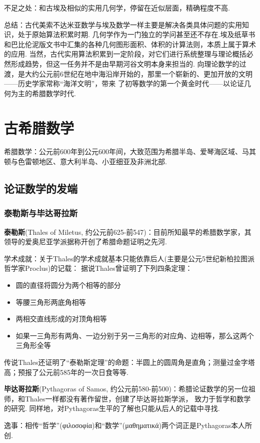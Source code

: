 \documentclass{Math_Note}
\begin{document}
不足之处：和古埃及相似的实用几何学，停留在近似层面，精确程度不高.

总结：古代美索不达米亚数学与埃及数学一样主要是解决各类具体问题的实用知识，处于原始算法积累时期.
几何学作为一门独立的学问甚至还不存在.埃及纸草书和巴比伦泥版文书中汇集的各种几何图形面积、体积的计算法则，本质上属于算术的应用.
当然，古代实用算法积累到一定阶段，对它们进行系统整理与理论概括必然形成趋势，但这一任务并不是由早期河谷文明本身来担当的.
向理论数学的过渡，是大约公元前6世纪在地中海沿岸开始的，那里一个崭新的、更加开放的文明——历史学家常称“海洋文明”，带来
了初等数学的第一个黄金时代——以论证几何为主的希腊数学时代.

\section{古希腊数学}
希腊数学：公元前600年到公元600年间，大致范围为希腊半岛、爱琴海区域、马其顿与色雷顿地区、意大利半岛、小亚细亚及非洲北部.
\subsection{论证数学的发端}
\subsubsection{泰勒斯与毕达哥拉斯}
\textbf{泰勒斯}(Thales of Miletus, 约公元前625-前547)：目前所知最早的希腊数学家，其领导的爱奥尼亚学派据称开创了希腊命题证明之先河.

学术成就：关于Thales的学术成就基本只能依靠后人(主要是公元5世纪新柏拉图派哲学家Proclus)的记载：
据说Thales曾证明了下列四条定理：
\begin{itemize}
    \item 圆的直径将圆分为两个相等的部分
    \item 等腰三角形两底角相等
    \item 两相交直线形成的对顶角相等
    \item 如果一三角形有两角、一边分别于另一三角形的对应角、边相等，那么这两个三角形全等
\end{itemize}
传说Thales还证明了“泰勒斯定理”的命题：半圆上的圆周角是直角；测量过金字塔高；预报了公元前585年的一次日食等等.

\textbf{毕达哥拉斯}(Pythagoras of Samos, 约公元前580-前500)：希腊论证数学的另一位祖师，和Thales一样都没有著作留世，创建了毕达哥拉斯学派，
致力于哲学和数学的研究. 同样地，对Pythagoras生平的了解也只能从后人的记载中寻找.

逸事：相传“哲学”(φιλοσοφία)和“数学”(μαθηματικά)两个词正是Pythagoras本人所创.
\end{document}

